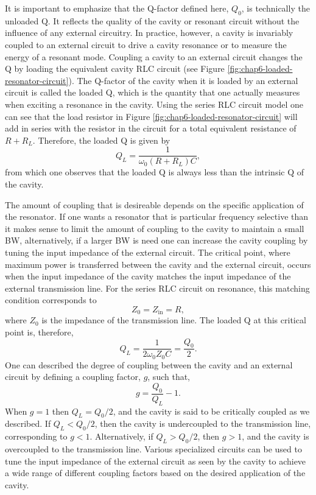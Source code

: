 It is important to emphasize that the Q-factor defined here, $Q_0$, is technically the unloaded Q. It reflects the quality of the cavity or resonant circuit without the influence of any external circuitry. In practice, however, a cavity is invariably coupled to an external circuit to drive a cavity resonance or to measure the energy of a resonant mode. Coupling a cavity to an external circuit changes the Q by loading the equivalent cavity RLC circuit (see Figure \ref{fig:chap6-loaded-resonator-circuit}). The Q-factor of the cavity when it is loaded by an external circuit is called the loaded Q, which is the quantity that one actually measures when exciting a resonance in the cavity. Using the series RLC circuit model one can see that the load resistor in Figure \ref{fig:chap6-loaded-resonator-circuit} will add in series with the resistor in the circuit for a total equivalent resistance of $R+R_L$. Therefore, the loaded Q is given by 
\begin{equation}
    Q_L=\frac{1}{\omega_0(R+R_L)C},
\end{equation}
from which one observes that the loaded Q is always less than the intrinsic Q of the cavity.

The amount of coupling that is desireable depends on the specific application of the resonator. If one wants a resonator that is particular frequency selective than it makes sense to limit the amount of coupling to the cavity to maintain a small BW, alternatively, if a larger BW is need one can increase the cavity coupling by tuning the input impedance of the external circuit. The critical point, where maximum power is transferred between the cavity and the external circuit, occurs when the input impedance of the cavity matches the input impedance of the external transmission line.  For the series RLC circuit on resonance, this matching condition corresponds to 
\begin{equation}
    Z_0=Z_\mathrm{in}=R,
\end{equation}
where $Z_0$ is the impedance of the transmission line. The loaded Q at this critical point is, therefore,
\begin{equation}
    Q_L=\frac{1}{2\omega_0Z_0C}=\frac{Q_0}{2}.
\end{equation}
One can described the degree of coupling between the cavity and an external circuit by defining a coupling factor, $g$, such that,
\begin{equation}
    g=\frac{Q_0}{Q_L}-1.
\end{equation} 
When $g=1$ then $Q_L=Q_0/2$, and the cavity is said to be critically coupled as we described. If $Q_L<Q_0/2$, then the cavity is undercoupled to the transmission line, corresponding to $g<1$. Alternatively, if $Q_L>Q_0/2$, then $g>1$, and the cavity is overcoupled to the transmission line. Various specialized circuits can be used to tune the input impedance of the external circuit as seen by the cavity to achieve a wide range of different coupling factors based on the desired application of the cavity.

